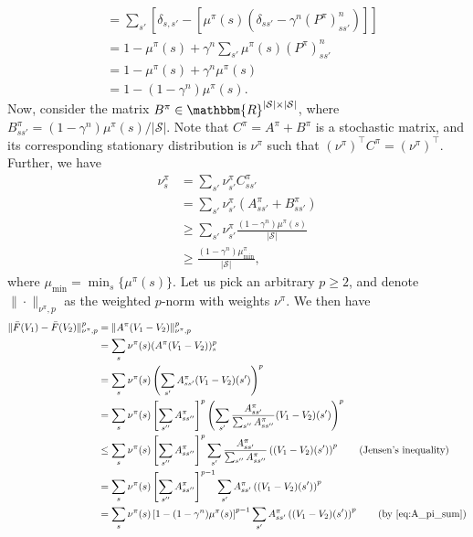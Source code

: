 \documentclass[letterpaper, 10 pt]{article}
\begin{document}
\begin{itemize}
\begin{align}
        &=\sum_{s'} \left[\delta_{s,s'}-\left[\mu^\pi(s)(\delta_{ss'} -\gamma^n (P^\pi)^n_{ss'})\right]\right]\nonumber\\
        &=1-\mu^\pi(s)+\gamma^n\sum_{s'}\mu^\pi(s)(P^{\pi})^n_{ss'}\nonumber\\
        &=1-\mu^\pi(s)+\gamma^n\mu^\pi(s)\nonumber\\
        &=1-(1-\gamma^n)\mu^\pi(s).\label{eq:A_pi_sum}
    \end{align}
    Now, consider the matrix $B^\pi\in\mathbbm{R}^{|\mathcal{S}|\times|\mathcal{S}|}$, where $B^\pi_{ss'}=(1-\gamma^n)\mu^\pi(s)/|\mathcal{S}|$. Note that $C^\pi=A^\pi+B^\pi$ is a stochastic matrix, and its corresponding stationary distribution is $\nu^\pi$ such that $(\nu^\pi)^\top C^\pi=(\nu^\pi)^\top$. Further, we have
    \begin{align}
        \nu^\pi_s&= \sum_{s'}\nu^{\pi}_{s'}C^\pi_{ss'}\nonumber\\
        &=\sum_{s'}\nu^{\pi}_{s'}(A^\pi_{ss'} + B^\pi_{ss'})\nonumber\\
        &\geq\sum_{s'}\nu^{\pi}_{s'}\frac{(1-\gamma^n)\mu^\pi(s)}{|\mathcal{S}|}\nonumber\\
        &\geq\frac{(1-\gamma^n)\mu^\pi_{\min}}{|\mathcal{S}|},\label{eq:mu_min_bound}
    \end{align}
    where $\mu_{\min}=\min_s \{\mu^\pi(s)\}$. Let us pick an arbitrary $p\geq 2$, and denote $\|\cdot\|_{\nu^\pi,p}$ as the weighted $p$-norm with weights $\nu^\pi$. We then have
    \begin{align*}
        \|\bar{F}(V_1)-\bar{F}(V_2)\|_{\nu^\pi,p}^p &=\|A^\pi (V_1-V_2)\|_{\nu^\pi,p}^p\\
        &= \sum_{s}\nu^{\pi}(s) (A^\pi (V_1-V_2))_s^p \\
        &= \sum_{s}\nu^{\pi}(s) \left(\sum_{s'}A^\pi_{ss'} (V_1-V_2)(s')\right)^p \\
        &= \sum_{s}\nu^{\pi}(s)\left[\sum_{s''}A_{ss''}^\pi\right]^p \left( \sum_{s'}\frac{A^\pi_{ss'}}{\sum_{s''}A_{ss''}^\pi} (V_1-V_2)(s')\right)^p \\
        &\leq \sum_{s}\nu^{\pi}(s)\left[\sum_{s''}A_{ss''}^\pi\right]^p \sum_{s'}\frac{A^\pi_{ss'}}{\sum_{s''}A_{ss''}^\pi}\left(  (V_1-V_2)(s')\right)^p \tag{Jensen's inequality}\\
        &= \sum_{s}\nu^{\pi}(s)\left[\sum_{s''}A_{ss''}^\pi\right]^{p-1} \sum_{s'}A^\pi_{ss'}\left(  (V_1-V_2)(s')\right)^p\\
        &= \sum_{s}\nu^{\pi}(s)\left[1-(1-\gamma^n)\mu^\pi(s)\right]^{p-1} \sum_{s'}A^\pi_{ss'}\left(  (V_1-V_2)(s')\right)^p\tag{by \eqref{eq:A_pi_sum}}\\

\end{align*}
\end{itemize}
\end{document}
